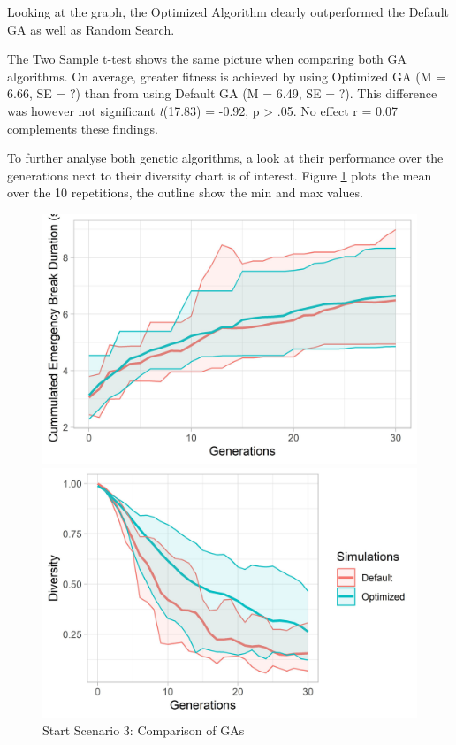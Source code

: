 Looking at the graph, the Optimized Algorithm clearly outperformed the Default GA as well as Random Search.

The Two Sample t-test shows the same picture when comparing both GA algorithms. On average, greater fitness is achieved by using Optimized GA (M = 6.66, SE = ?) than from using Default GA (M = 6.49, SE = ?). This difference was however not significant \textit{t}(17.83) = -0.92, p > .05. No effect r = 0.07  complements these findings.

To further analyse both genetic algorithms, a look at their performance over the generations next to their diversity chart is of interest. Figure \ref{figure:sim_3_ga_comparison} plots the mean over the 10 repetitions, the outline show the min and max values.

\begin{figure}[ht] 
	\label{figure:sim_3_ga_comparison}
	\begin{minipage}[b]{0.5\linewidth}
		\centering
		\includegraphics[width=1\linewidth]{simulations/evaluation/plots/sim_3_ga_generations} 
	\end{minipage}%
	\begin{minipage}[b]{0.5\linewidth}
		\centering
		\includegraphics[width=1\linewidth]{simulations/evaluation/plots/sim_3_ga_diversity} 
	\end{minipage} 
	\caption{Start Scenario 3: Comparison of GAs}
\end{figure}



